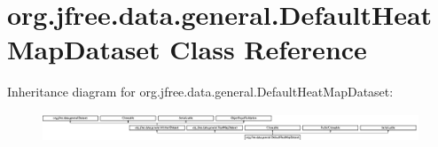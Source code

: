 \hypertarget{classorg_1_1jfree_1_1data_1_1general_1_1_default_heat_map_dataset}{}\section{org.\+jfree.\+data.\+general.\+Default\+Heat\+Map\+Dataset Class Reference}
\label{classorg_1_1jfree_1_1data_1_1general_1_1_default_heat_map_dataset}
Inheritance diagram for org.\+jfree.\+data.\+general.\+Default\+Heat\+Map\+Dataset\+:\begin{figure}[H]
\begin{center}
\leavevmode
\includegraphics[height=0.854092cm]{classorg_1_1jfree_1_1data_1_1general_1_1_default_heat_map_dataset}
\end{center}
\end{figure}
